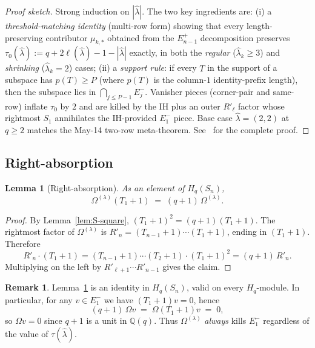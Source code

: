 \documentclass[11pt]{article}
\newtheorem{lemma}[theorem]{Lemma}
\theoremstyle{definition}
\newtheorem{remark}[theorem]{Remark}
\newcommand{\Hq}{H_q}
\newcommand{\Sn}{S_n}
\newcommand{\Om}{\Omega}
\newcommand{\bla}{\widehat\lambda}
\newcommand{\elh}{\ell(\bla)}
\newcommand{\Rp}{{R'}}
\newcommand{\Eminus}{E^{-}}
\begin{document}
\begin{proof}[Proof sketch]
Strong induction on $|\bla|$.  The two key ingredients are: (i) a \emph{threshold-matching identity} (multi-row form) showing that every length-preserving contributor $\mu_{k,*}$ obtained from the $E^+_{n-1}$ decomposition preserves $\tau_0(\bla) := q + 2\elh - 1 - |\bla|$ exactly, in both the \emph{regular} ($\bla_k \ge 3$) and \emph{shrinking} ($\bla_k = 2$) cases; (ii) a \emph{support rule}: if every $T$ in the support of a subspace has $p(T) \ge P$ (where $p(T)$ is the column-$1$ identity-prefix length), then the subspace lies in $\bigcap_{j \le P-1} \Eminus_j$.  Vanisher pieces (corner-pair and same-row) inflate $\tau_0$ by $2$ and are killed by the IH plus an outer $\Rp_\ell$ factor whose rightmost $S_1$ annihilates the IH-provided $\Eminus_1$ piece.  Base case $\bla = (2,2)$ at $q \ge 2$ matches the May-14 two-row meta-theorem.  See~\cite[Theorem 1]{multirowMay15} for the complete proof.
\end{proof}

\subsection{Right-absorption}

\begin{lemma}[Right-absorption]\label{lem:right-absorb}
As an element of $\Hq(\Sn)$,
\[
   \Om^{(\lambda)} (T_1 + 1) \;=\; (q+1)\, \Om^{(\lambda)}.
\]
\end{lemma}

\begin{proof}
By Lemma~\ref{lem:S-square}, $(T_1 + 1)^2 = (q+1)(T_1+1)$.  The rightmost factor of $\Om^{(\lambda)}$ is $\Rp_n = (T_{n-1}+1)\cdots(T_1+1)$, ending in $(T_1+1)$.  Therefore
\[
   \Rp_n \cdot (T_1 + 1)
   = (T_{n-1}+1)\cdots(T_2+1) \cdot (T_1+1)^2
   = (q+1)\, \Rp_n.
\]
Multiplying on the left by $\Rp_{\ell+1}\cdots \Rp_{n-1}$ gives the claim.
\end{proof}

\begin{remark}\label{rem:right-absorb-universal}
Lemma~\ref{lem:right-absorb} is an identity in $\Hq(\Sn)$, valid on every $\Hq$-module.  In particular, for any $v \in \Eminus_1$ we have $(T_1+1)v = 0$, hence
\[
   (q+1)\,\Om v \;=\; \Om(T_1+1)v \;=\; 0,
\]
so $\Om v = 0$ since $q+1$ is a unit in $\mathbb{Q}(q)$.  Thus $\Om^{(\lambda)}$ \emph{always} kills $\Eminus_1$ regardless of the value of $\tau(\bla)$.
\end{remark}
\end{document}
